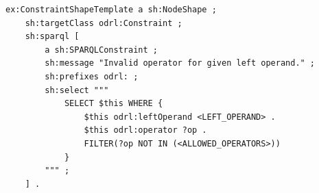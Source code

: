 \pagebreak

\begin{scriptsize}
\begin{lstlisting}[language=turtle, caption=Template shape to detect the usage of an invalid operator for a given left operand., label=lst:shacl]
ex:ConstraintShapeTemplate a sh:NodeShape ;
    sh:targetClass odrl:Constraint ;
    sh:sparql [
        a sh:SPARQLConstraint ;
        sh:message "Invalid operator for given left operand." ;
        sh:prefixes odrl: ;
        sh:select """
            SELECT $this WHERE {
                $this odrl:leftOperand <LEFT_OPERAND> .
                $this odrl:operator ?op .
                FILTER(?op NOT IN (<ALLOWED_OPERATORS>))
            }
        """ ;
    ] .
\end{lstlisting}
\end{scriptsize}